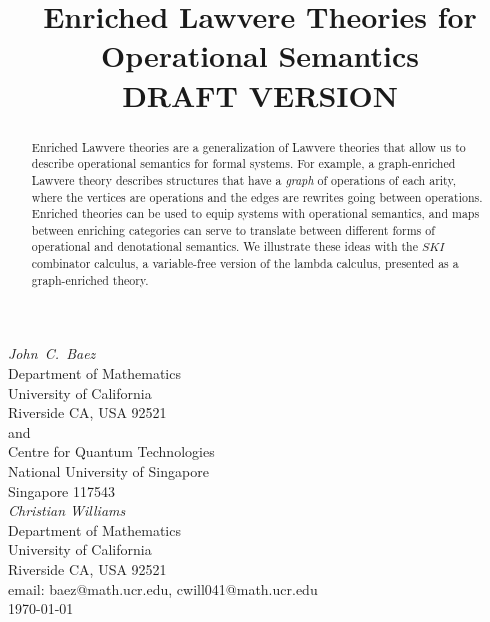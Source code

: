 \documentclass{amsart}
\theoremstyle{definition}
\begin{document}
\title{Enriched Lawvere Theories 
for Operational Semantics \\ DRAFT VERSION}

\maketitle
\begin{center}   
  {\em John\ C.\ Baez \\}
  \vspace{0.3cm}
  {\small
 Department of Mathematics \\
    University of California \\
  Riverside CA, USA 92521 \\ and \\
 Centre for Quantum Technologies  \\
    National University of Singapore \\
    Singapore 117543  \\    } 
  \vspace{0.4cm}
{\em Christian Williams \\}
\vspace{0.3cm}
   {\small
   Department of Mathematics \\
  University of California \\
  Riverside CA, USA 92521 \\}
  \vspace{0.3cm}   
  {\small email:  baez@math.ucr.edu, cwill041@math.ucr.edu\\} 
  \vspace{0.3cm}   
  {\small \today}
  \vspace{0.3cm}   
\end{center} 

\begin{abstract} 
Enriched Lawvere theories are a generalization of Lawvere theories that allow us to describe operational semantics for formal systems.  For example, a graph-enriched Lawvere theory describes structures that have a \emph{graph} of operations of each arity, where the vertices are operations and the edges are rewrites going between operations. Enriched theories can be used to equip systems with operational semantics, and maps between enriching categories can serve to translate between different forms of operational and denotational semantics.  We illustrate these ideas with the $SKI$ combinator calculus, a variable-free version of the lambda calculus, presented as a graph-enriched theory.  
\end{abstract}
\end{document}

